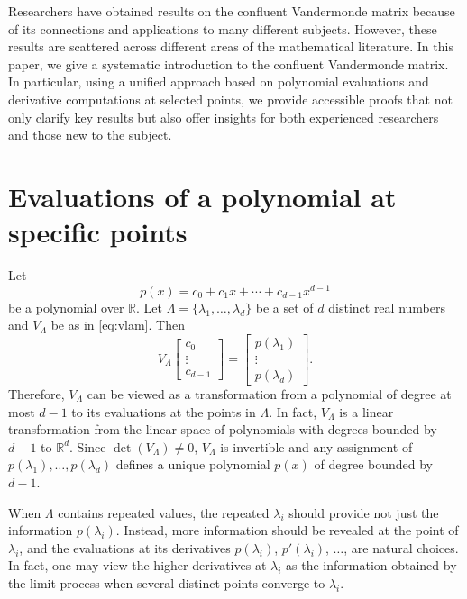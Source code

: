 \documentclass{article}
\theoremstyle{definition}
\begin{document}
Researchers have obtained results on the confluent Vandermonde matrix because of its connections
and applications to many different subjects. However, these results are scattered across different areas of the
mathematical literature. In this paper, we give a systematic introduction to the confluent Vandermonde matrix. In particular,  
using a unified approach based on polynomial evaluations and derivative computations at selected points, we
provide accessible proofs that not only clarify key results but also offer insights for both experienced researchers and those new
to the subject.

\section{Evaluations of a polynomial at specific points}
\label{sec:eval}

Let  
\begin{equation}
\label{eq:poly}
    p(x) = c_0 + c_1x + \cdots + c_{d-1}x^{d-1}
\end{equation}
be a polynomial over $\mathbb{R}$.  Let $\Lambda = \{\lambda_1, \ldots, \lambda_d\}$ be a set of $d$ 
distinct real numbers and $V_\Lambda$ be as in \cref{eq:vlam}.  Then  
\begin{equation}
\label{eq:veval}
    V_\Lambda
    \begin{bmatrix} c_0 \\ \vdots \\ c_{d-1} \end{bmatrix}
    =
    \begin{bmatrix} p(\lambda_1) \\ \vdots \\ p(\lambda_d) \end{bmatrix}.
\end{equation}
Therefore, $V_\Lambda$ can be viewed as a transformation from a polynomial of degree at most $d-1$
to its evaluations at the points in $\Lambda$.  In fact, $V_\Lambda$ is a linear transformation from the 
linear space of polynomials with degrees bounded by $d-1$ to ${\mathbb R}^d$. 
Since $\det(V_\Lambda) \neq 0$, $V_\Lambda$ is invertible and any assignment of 
$p(\lambda_1), \ldots, p(\lambda_d)$ defines a unique polynomial $p(x)$ of degree bounded by $d-1$.  

When $\Lambda$ contains repeated values, the repeated $\lambda_i$ should provide not just the 
information $p(\lambda_i)$.  Instead, more information should be revealed at the point of $\lambda_i$, and 
the evaluations at its derivatives $p(\lambda_i)$, $p'(\lambda_i)$, $\ldots$, are natural choices.
In fact, one may view the higher derivatives at $\lambda_i$ as the information obtained by the limit process
when several distinct points converge to $\lambda_i$.
\end{document}
